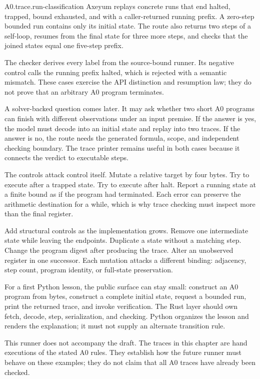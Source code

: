 \begin{artifact}{A0.trace.run-classification}
Axeyum replays concrete runs that end halted, trapped, bound exhausted, and
with a caller-returned running prefix. A zero-step bounded run contains only
its initial state. The route also returns two steps of a self-loop, resumes
from the final state for three more steps, and checks that the joined states
equal one five-step prefix.

The checker derives every label from the source-bound runner. Its negative
control calls the running prefix halted, which is rejected with a semantic
mismatch. These cases exercise the API distinction and resumption law; they do
not prove that an arbitrary A0 program terminates.
\end{artifact}

A solver-backed question comes later. It may ask whether two short A0 programs
can finish with different observations under an input premise. If the answer
is yes, the model must decode into an initial state and replay into two traces.
If the answer is no, the route needs the generated formula, scope, and
independent checking boundary. The trace printer remains useful in both cases
because it connects the verdict to executable steps.

The controls attack control itself. Mutate a relative target by four bytes.
Try to execute after a trapped state. Try to execute after halt. Report a
running state at a finite bound as if the program had terminated. Each error
can preserve the arithmetic destination for a while, which is why trace
checking must inspect more than the final register.

Add structural controls as the implementation grows. Remove one intermediate
state while leaving the endpoints. Duplicate a state without a matching step.
Change the program digest after producing the trace. Alter an unobserved
register in one successor. Each mutation attacks a different binding:
adjacency, step count, program identity, or full-state preservation.

For a first Python lesson, the public surface can stay small: construct an A0
program from bytes, construct a complete initial state, request a bounded run,
print the returned trace, and invoke verification. The Rust layer should own
fetch, decode, step, serialization, and checking. Python organizes the lesson
and renders the explanation; it must not supply an alternate transition rule.

This runner does not accompany the draft. The traces in this chapter are hand
executions of the stated A0 rules. They establish how the future runner must
behave on these examples; they do not claim that all A0 traces have already
been checked.

